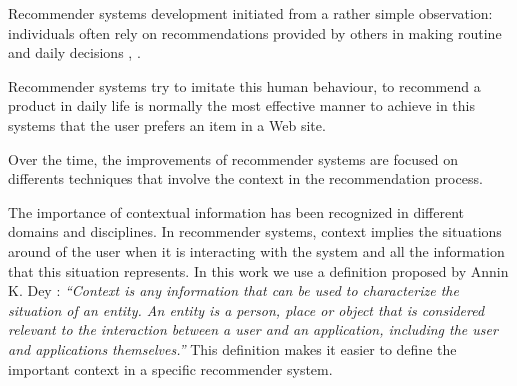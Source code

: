Recommender systems development initiated from a rather simple
observation: individuals often rely on recommendations provided by
others in making routine and daily decisions \cite{mahmood2009improving},
\cite{mcsherry2009differentially}. 


Recommender systems try to imitate this human behaviour, to
recommend a product in daily life is normally the most effective
manner to achieve in this systems that the user prefers an item in a
Web site.

Over the time, the improvements of recommender systems are
focused on differents techniques that involve the context in the
recommendation process. 

The importance of contextual information has
been recognized in different domains and disciplines. %
In recommender
systems, context implies the situations around of the user when it is %
interacting with the system and all the information that this
situation represents. 
In this work we use a definition proposed by Annin K.
Dey \cite{dey2001understanding}: \textit{``Context is any information
that can be used to characterize the situation of an entity. An entity
is a person, place or object that is considered relevant to the
interaction between a user and an application, including the user and
applications themselves.''} 
This definition makes it easier to define
the important context in a specific recommender system.\\  %

